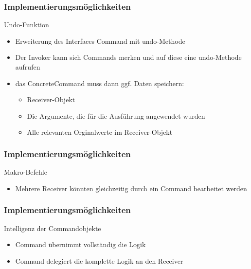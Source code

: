 \begin{frame}
	\frametitle{Implementierungsmöglichkeiten}
  	\begin{block}{Undo-Funktion}
\begin{itemize}
		\item Erweiterung des Interfaces Command mit undo-Methode
		\item Der Invoker kann sich Commands merken und auf diese eine undo-Methode aufrufen
		\item das ConcreteCommand muss dann ggf. Daten speichern:
			\begin{itemize}
				\item Receiver-Objekt
				\item Die Argumente, die für die Ausführung angewendet wurden
				\item Alle relevanten Orginalwerte im Receiver-Objekt
			\end{itemize}
	\end{itemize}	
   \end{block}
\end{frame}

\begin{frame}
	\frametitle{Implementierungsmöglichkeiten}
  	\begin{block}{Makro-Befehle}
		\begin{itemize}
			\item Mehrere Receiver könnten gleichzeitig durch ein Command bearbeitet werden
		\end{itemize}	
   \end{block}
\end{frame}



\begin{frame}
	\frametitle{Implementierungsmöglichkeiten}
  	\begin{block}{Intelligenz der Commandobjekte}
		\begin{itemize}
		\item Command übernimmt vollständig die Logik
		\item Comnand delegiert die komplette Logik an den Receiver
	\end{itemize}	
   \end{block}
   
		
\end{frame}



